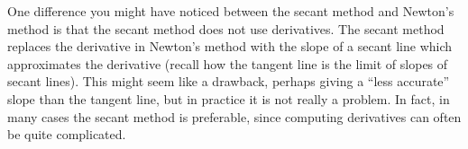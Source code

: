 \newpage
One difference you might have noticed between the secant method and Newton's
method is that the secant method does not use derivatives. The secant method
replaces the derivative in Newton's method with the slope of a secant line
which approximates the derivative (recall how the tangent line is the limit
of slopes of secant lines). This might seem like a drawback, perhaps giving a
``less accurate'' slope than the tangent line, but in practice it is not really
a problem. In fact, in many cases the secant method is preferable, since
computing derivatives can often be quite complicated.

